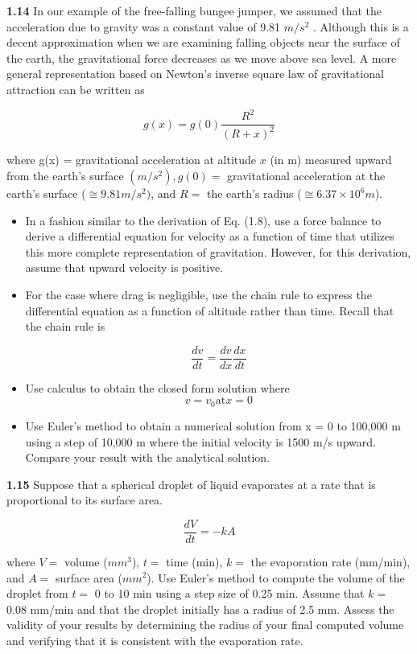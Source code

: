 \documentclass[../main.tex]{subfiles}
\begin{document}
\begin{multicols}{2}
\textbf{1.14} In our example of the free-falling bungee jumper, we
assumed that the acceleration due to gravity was a constant
value of 9.81 $m/s^2$
. Although this is a decent approximation
when we are examining falling objects near the surface of
the earth, the gravitational force decreases as we move
above sea level. A more general representation based on
Newton's inverse square law of gravitational attraction can
be written as

$$ g(x)= g(0)\dfrac{R^2}{(R+x)^2}$$

where g(x) = gravitational acceleration at altitude $x$ (in m)
measured upward from the earth's surface $(m/s^2), g(0) =$
gravitational acceleration at the earth's surface ($\cong  9.81 m/s^2)$,
and $R =$ the earth's radius ($\cong  6.37 × 10^6 m$). 
\begin{itemize}
	\item  In a fashion similar to the derivation of Eq. (1.8), use a
	force balance to derive a differential equation for velocity as a function of time that utilizes this more complete
	representation of gravitation. However, for this derivation, assume that upward velocity is positive. 

	\item For the case where drag is negligible, use the chain rule
	to express the differential equation as a function of altitude rather than time. Recall that the chain rule is

	$$\dfrac{dv}{dt} = \dfrac{dv}{dx}\dfrac{dx}{dt} $$

	\item Use calculus to obtain the closed form solution where
	$$ v=v_0 \text{at} x=0 $$
	\item Use Euler's method to obtain a numerical solution from
	x = 0 to 100,000 m using a step of 10,000 m where the
	initial velocity is 1500 m/s upward. Compare your result
	with the analytical solution.


\end{itemize}

\textbf{1.15} Suppose that a spherical droplet of liquid evaporates at
a rate that is proportional to its surface area.


$$ \dfrac{dV}{dt} = -kA$$

where $V =$ volume ($mm^3$), $t =$ time (min), $k =$ the evaporation rate (mm/min), and $A =$ surface area ($mm^2$). Use
Euler's method to compute the volume of the droplet from
$t =$ 0 to 10 min using a step size of 0.25 min. Assume that
$k =$ 0.08 mm/min and that the droplet initially has a radius of
2.5 mm. Assess the validity of your results by determining
the radius of your final computed volume and verifying that
it is consistent with the evaporation rate. 


\end{multicols}
\end{document}
